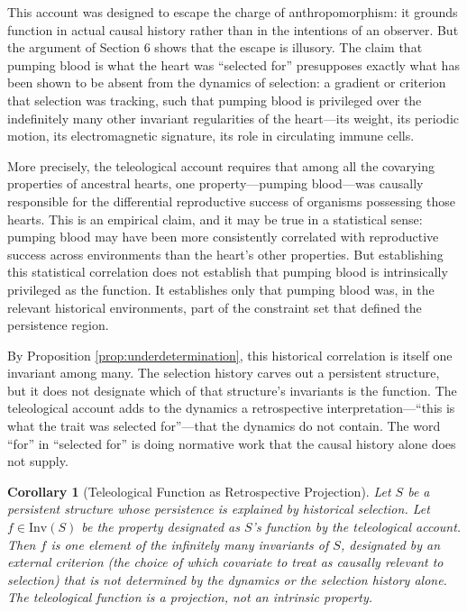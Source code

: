 \documentclass[12pt, a4paper, oneside]{article}
\theoremstyle{plain}
\newtheorem{corollary}[theorem]{Corollary}
\theoremstyle{definition}
\theoremstyle{remark}
\begin{document}
This account was designed to escape the charge of anthropomorphism: it grounds function in actual causal history rather than in the intentions of an observer. But the argument of Section 6 shows that the escape is illusory. The claim that pumping blood is what the heart was ``selected for'' presupposes exactly what has been shown to be absent from the dynamics of selection: a gradient or criterion that selection was tracking, such that pumping blood is privileged over the indefinitely many other invariant regularities of the heart---its weight, its periodic motion, its electromagnetic signature, its role in circulating immune cells.

More precisely, the teleological account requires that among all the covarying properties of ancestral hearts, one property---pumping blood---was causally responsible for the differential reproductive success of organisms possessing those hearts. This is an empirical claim, and it may be true in a statistical sense: pumping blood may have been more consistently correlated with reproductive success across environments than the heart's other properties. But establishing this statistical correlation does not establish that pumping blood is intrinsically privileged as the function. It establishes only that pumping blood was, in the relevant historical environments, part of the constraint set that defined the persistence region.

By Proposition \ref{prop:underdetermination}, this historical correlation is itself one invariant among many. The selection history carves out a persistent structure, but it does not designate which of that structure's invariants is the function. The teleological account adds to the dynamics a retrospective interpretation---``this is what the trait was selected for''---that the dynamics do not contain. The word ``for'' in ``selected for'' is doing normative work that the causal history alone does not supply.

\begin{corollary}[Teleological Function as Retrospective Projection]
\label{cor:teleology}
Let $S$ be a persistent structure whose persistence is explained by historical selection. Let $f \in \mathrm{Inv}(S)$ be the property designated as $S$'s function by the teleological account. Then $f$ is one element of the infinitely many invariants of $S$, designated by an external criterion (the choice of which covariate to treat as causally relevant to selection) that is not determined by the dynamics or the selection history alone. The teleological function is a projection, not an intrinsic property.
\end{corollary}
\end{document}
